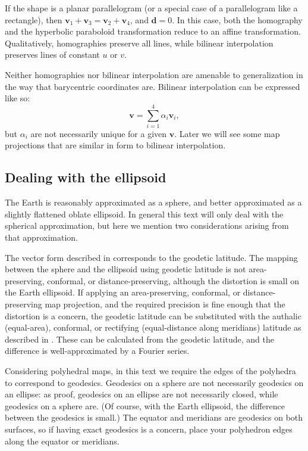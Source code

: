 \documentclass{amsart}[12pt]
\begin{document}
If the shape is a planar parallelogram (or a special case of a parallelogram
like a rectangle), then $\mathbf v_1 + \mathbf v_3 = \mathbf v_2 + \mathbf v_4$,
and $\mathbf{d} = 0$. In this case, both the homography and the hyperbolic
paraboloid transformation reduce to an affine transformation. Qualitatively, homographies preserve all lines,
while bilinear interpolation preserves lines of constant $u$ or $v$.

Neither homographies nor bilinear interpolation are amenable to generalization
in the way that barycentric coordinates are. Bilinear interpolation can be
expressed like so:
\begin{equation}
  \mathbf v = \sum^4_{i=1} \alpha_i \mathbf v_i,
\end{equation}
but $\alpha_i$ are not necessarily unique for a given $\mathbf v$. Later we
will see some map projections that are similar in form to bilinear interpolation.

\subsection{Dealing with the ellipsoid}
The Earth is reasonably approximated as a sphere, and better approximated as a
slightly flattened oblate ellipsoid. In general this text will only deal with
the spherical approximation, but here we mention two considerations arising
from that approximation.

The vector form described in \cite{gade} corresponds to the geodetic latitude.
The mapping between the sphere and the ellipsoid using geodetic latitude is not
area-preserving, conformal, or distance-preserving, although the distortion is
small on the Earth ellipsoid. If applying an area-preserving, conformal, or
distance-preserving map projection, and the required precision is fine enough
that the distortion is a concern, the geodetic latitude can be substituted
with the authalic (equal-area), conformal, or rectifying
(equal-distance along meridians) latitude as described in \cite{snyder87}.
These can be calculated from the geodetic latitude,
and the difference is well-approximated by a Fourier series.

Considering polyhedral maps, in this text we require the edges of the polyhedra
to correspond to geodesics. Geodesics on a sphere are not necessarily geodesics
on an ellipse: as proof, geodesics on an ellipse are not necessarily closed,
while geodesics on a sphere are. (Of course, with the Earth ellipsoid, the
difference between the geodesics is small.) The equator and meridians are
geodesics on both surfaces, so if having exact geodesics is a concern,
place your polyhedron edges along the equator or meridians.
\end{document}
